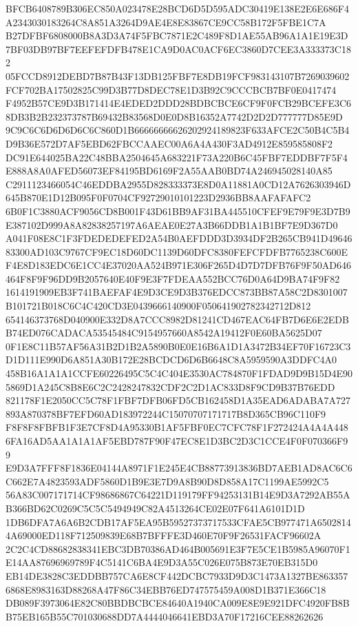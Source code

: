 \documentclass[UTF8,fontset=fandol,zihao=-4,a4paper]{ctexart}
\begin{document}
{{BFCB6408789B306EC850A023478E28BCD6D5D595ADC30419E138E2E6E686F4A2343030183264C8A851A3264D9AE4E8E83867CE9CC58B172F5FBE1C7A
B27DFBF6808000B8A3D3A74F5FBC7871E2C489F8D1AE55AB96A1A1E19E3D7BF03DB97BF7EEFEFDFB478E1CA9D0AC0ACF6EC3860D7CEE3A333373C182
05FCCD8912DEBD7B87B43F13DB125FBF7E8DB19FCF983143107B7269039602FCF702BA17502825C99D3B77D8DEC78E1D3B92C9CCCBCB7BF0E0417474
F4952B57CE9D3B171414E4EDED2DDD28BDBCBCE6CF9F0FCB29BCEFE3C68DB3B2B232373787B69432B83568D0E0D8B16352A7742D2D2D777777D85E9D
9C9C6C6D6D6D6C6C860D1B66666666626202924189823F633AFCE2C50B4C5B4D9B36E572D7AF5EBD62FBCCAAEC00A6A4A430F3AD4912E859585808F2
DC91E644025BA22C48BBA2504645A683221F73A220B6C45FBF7EDDBF7F5F4E888A8A0AFED56073EF84195BD6169F2A55AAB0BD74A246945028140A85
C2911123466054C46EDDBA2955D828333373E8D0A11881A0CD12A7626303946D645B870E1D12B095F0F0704CF92729010101223D2936BB8AAFAFAFC2
6B0F1C3880ACF9056CD8B001F43D61BB9AF31BA445510CFEF9E79F9E3D7B9E387102D999A8A82838257197A6AEAE0E27A3B66DDB1A1B1BF7E9D367D0
A041F08E8C1F3FDEDEDEFED2A54B0AEFDDD3D3934DF2B265CB941D4964683300AD103C9767CF9EC18D60DC1139D60DFC8380FEFCFDFB7765238C600E
F4E8D183EDC6E1CC4E37020AA524B971E306F265D4D7D7DFB76F9F50AD646464F8F9F96DD9B2057640E40F9E3F7FDEAA552BCC76D0A64D9BA74F9F82
1614191909EB3F741BAEFAF4E9D3CE9D3B376EDCC873BB87A58C2D8301007B101721B018C6C4C420CD3E0439666140900F050641902782342712D812
654146373768D040900E332D8A7CCC8982D81241CD467EAC64FB7D6E6E2EDBB74ED076CADACA53545484C9154957660A8542A19412F0E60BA5625D07
0F1E8C11B57AF56A31B2D1B2A5890B0E0E16B6A1D1A3472B34EF70F16723C3D1D111E990D6A851A30B172E28BCDCD6D6B6648C8A5959590A3DDFC4A0
458B16A1A1A1CCFE60226495C5C4C404E3530AC784870F1FDAD9D9B15D4E905869D1A245C8B8E6C2C2428247832CDF2C2D1AC833D8F9CD9B37B76EDD
821178F1E2050CC5C78F1FBF7DFB06FD5CB162458D1A35EAD6ADABA7A727893A870378BF7EFD60AD183972244C15070707171717B8D365CB96C110F9
F8F8F8FBFB1F3E7CF8D4A95330B1AF5FBF0EC7CFC78F1F272424A4A4A4486FA16AD5AA1A1A1AF5EBD787F90F47EC8E1D3BC2D3C1CCE4F0F070366F99
E9D3A7FFF8F1836E04144A8971F1E245E4CB88773913836BD7AEB1AD8AC6C6C662E7A4823593ADF5860D1B9E3E7D9A8B90D8D858A17C1199AE5992C5
56A83C007171714CF98686867C64221D119179FF94253131B14E9D3A7292AB55AB366BD62C0269C5C5C5494949C82A4513264CE02E07F641A6101D1D
1DB6DFA7A6A6B2CDB17AF5EA95B59527373717533CFAE5CB977471A65028144A69000ED118F712509839E68B7BFFFE3D460E70F9F26531FACF96602A
2C2C4CD88682838341EBC3DB70386AD464B005691E3F7E5CE1B5985A96070F1E14AA87696969789F4C5141C6BA4E9D3A55C026E075B873E70EB315D0
EB14DE3828C3EDDBB757CA6E8CF442DCBC7933D9D3C1473A1327BE8633576868E8983163D88268A47F86C34EBB76ED747575459A008D1B371E366C18
DB089F3973064E82C80BBDBCBCE84640A1940CA009E8E9E921DFC4920FB8BB75EB165B55C701030688DD7A4444046641EBD3A70F17216CEE88262626
}}
\end{document}
